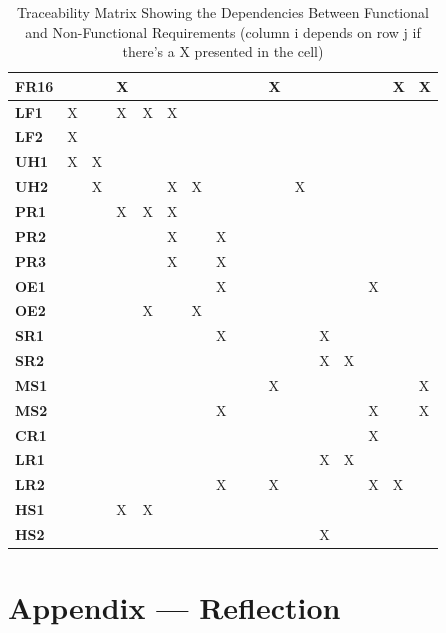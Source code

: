 \documentclass[12pt]{article}
\begin{document}
{\begin{landscape}
\begin{table}[h!]
\begin{tabular}{|p{1cm}|p{0.9cm}|p{0.9cm}|p{0.9cm}|p{0.9cm}|p{0.9cm}|p{0.9cm}|p{0.9cm}|p{0.9cm}|p{0.9cm}|p{0.9cm}|p{0.9cm}|p{0.9cm}|p{0.9cm}|p{0.9cm}|p{0.9cm}|p{0.9cm}|}
\hline
\textbf{FR16} & & & X & & & & & & & X & & & & & X & X \\ 
\hline
\textbf{LF1} & X & & X & X & X & & & & & & & & & & & \\ 
\hline
\textbf{LF2} & X & & & & & & & & & & & & & & & \\ 
\hline
\textbf{UH1} & X & X & & & & & & & & & & & & & & \\ 
\hline
\textbf{UH2} & & X & & & X & X & & & & & X & & & & & \\ 
\hline
\textbf{PR1} & & & X & X & X & & & & & & & & & & & \\ 
\hline
\textbf{PR2} & & & & & X & & X & & & & & & & & & \\ 
\hline
\textbf{PR3} & & & & & X & & X & & & & & & & & & \\ 
\hline
\textbf{OE1} & & & & & & & X & & & & & & & X & & \\ 
\hline
\textbf{OE2} & & & & X & & X & & & & & & & & & & \\ 
\hline
\textbf{SR1} & & & & & & & X & & & & & X & & & & \\ 
\hline
\textbf{SR2} & & & & & & & & & & & & X & X & & & \\ 
\hline
\textbf{MS1} & & & & & & & & & & X & & & & & & X \\ 
\hline
\textbf{MS2} & & & & & & & X & & & & & & & X & & X \\ 
\hline
\textbf{CR1} & & & & & & & & & & & & & & X & & \\ 
\hline
\textbf{LR1} & & & & & & & & & & & & X & X & & & \\ 
\hline
\textbf{LR2} & & & & & & & X & & & X & & & & X & X & \\ 
\hline
\textbf{HS1} & & & X & X & & & & & & & & & & & & \\ 
\hline
\textbf{HS2} & & & & & & & & & & & & X & & & & \\ 
\hline
\end{tabular}
\caption{Traceability Matrix Showing the Dependencies Between Functional and Non-Functional Requirements (column i depends on row j if there's a X presented in the cell)}
\label{Table:Traceability}
\end{table}
\end{landscape}
}
\newpage{}
\section*{Appendix --- Reflection}
\end{document}
